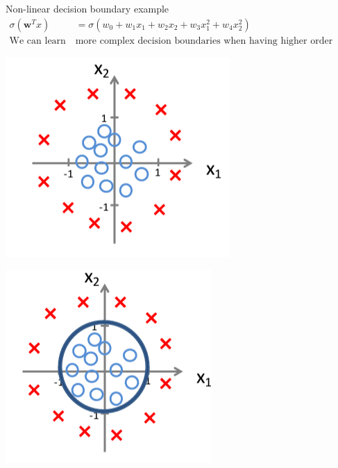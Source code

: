 \documentclass[serif, aspectratio=169]{beamer}
\begin{document}
\begin{frame}{Non-linear decision boundary example}
    \begin{align*}
        \sigma (\mathbf{w}^Tx) &= \sigma (w_0 + w_1 x_1 + w_2 x_2 + w_3x_1^2 + w_4x_2^2) \\
        \text{We can learn } & \text{more complex decision boundaries when having higher order terms}
    \end{align*}
    
    \begin{minipage}{0.30\linewidth}
        \centering
        \includegraphics[width=\linewidth]{pic/lrDB3.png}
    \end{minipage}
    \hfill
    \begin{minipage}{0.30\linewidth}
        \centering
        \includegraphics[width=\linewidth]{pic/lrDB4.png}
    \end{minipage}
    

\end{frame}
\end{document}
